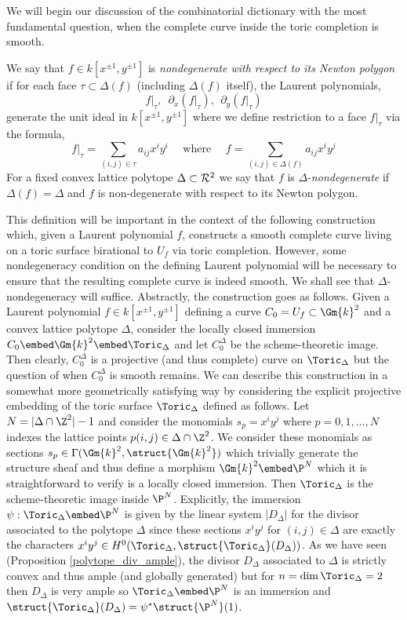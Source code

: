 \noindent
We will begin our discussion of the combinatorial dictionary with the most fundamental question, when the complete curve inside the toric completion is smooth. 

\begin{defn}
We say that $f \in k[x^{\pm 1}, y^{\pm 1}]$ is \textit{nondegenerate with respect to its Newton polygon} if for each face $\tau \subset \Delta(f)$ (including $\Delta(f)$ itself), the Laurent polynomials,
\[ f|_\tau, \: \; \partial_x (f|_\tau), \: \: \partial_y (f|_\tau) \]
generate the unit ideal in $k[x^{\pm 1}, y^{\pm 1}]$ where we define restriction to a face $f|_\tau$ via the formula,
\[ f |_{\tau} = \sum_{(i, j) \in \tau} a_{ij} x^i y^i \quad \text{ where } \quad f = \sum_{(i,j) \in \Delta(f)} a_{ij} x^i y^j \]
For a fixed convex lattice polytope $\Delta \subset \mathcal{R}^2$ we say that $f$ is $\Delta$-\textit{nondegenerate} if $\Delta(f) = \Delta$ and $f$ is non-degenerate with respect to its Newton polygon. 
\end{defn}
\noindent
This definition will be important in the context of the following construction which, given a Laurent polynomial $f$, constructs a smooth complete curve living on a toric surface birational  to $U_f$ via toric completion. However, some nondegeneracy condition on the defining Laurent polynomial will be necessary to ensure that the resulting complete curve is indeed smooth. We shall see that $\Delta$-nondegeneracy will suffice. Abstractly, the construction goes as follows. Given a Laurent polynomial $f \in k[x^{\pm 1}, y^{\pm 1}]$ defining a curve $C_0 = U_f \subset \Gm{k}^2$ and a convex lattice polytope $\Delta$, consider the locally closed immersion $C_0 \embed \Gm{k}^2 \embed \Toric_\Delta$ and let $C_0^\Delta$ be the scheme-theoretic image. Then clearly, $C_0^\Delta$ is a projective (and thus complete) curve on $\Toric_\Delta$ but the question of when $C_0^\Delta$ is smooth remains. We can describe this construction in a somewhat more geometrically satisfying way by considering the explicit projective embedding of the toric surface $\Toric_\Delta$ defined as follows. Let $N = | \Delta \cap \Z^2| - 1$ and consider the monomials $s_p = x^i y^j$ where $p = 0, 1, \dots, N$ indexes the lattice points $p(i, j) \in \Delta \cap \Z^2$. We consider these monomials as sections $s_p \in \Gamma(\Gm{k}^2, \struct{\Gm{k}^2})$ which trivially generate the structure sheaf and thus define a morphism $\Gm{k}^2 \embed \P^N$ which it is straightforward to verify is a locally closed immersion. Then $\Toric_\Delta$ is the scheme-theoretic image inside $\P^N$. Explicitly, the immersion $\psi : \Toric_\Delta \embed \P^N$ is given by the linear system $|D_\Delta|$ for the divisor associated to the polytope $\Delta$ since these sections $x^i y^j$ for $(i, j) \in \Delta$ are exactly the characters $x^i y^j \in H^0(\Toric_\Delta, \struct{\Toric_\Delta}(D_\Delta))$. As we have seen (Proposition \ref{polytope_div_ample}), the divisor $D_\Delta$ associated to $\Delta$ is strictly convex and thus ample (and globally generated) but for $n = \dim{\Toric_\Delta} = 2$ then $D_\Delta$ is very ample so $\Toric_\Delta \embed \P^N$ is an immersion and $\struct{\Toric_\Delta}(D_\Delta) = \psi^* \struct{\P^N}(1)$. 
